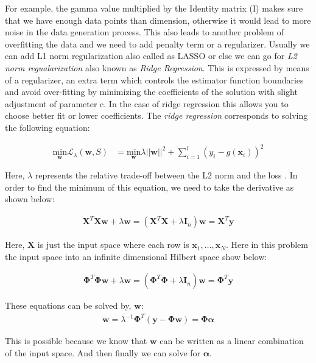 \documentclass[conference]{IEEEtran}
\begin{document}
For example, the gamma value multiplied by the Identity matrix (I) makes sure that we have enough data points than dimension, otherwise it would lead to more noise in the data generation process. This also leads to another problem of overfitting the data and we need to add penalty term or a regularizer. Usually we can add L1 norm regularization also called as LASSO or else we can go for \emph{L2 norm regualarization} also known as \emph{Ridge Regression}. This is expressed by means of a regularizer, an extra term which controls the estimator function boundaries and avoid over-fitting by minimizing the coefficients of the solution with slight adjustment of parameter c. In the case of ridge regression this allows you to choose better fit or lower coefficients.
The \emph{ridge regression} corresponds to solving the following equation: 

\begin{align*}
\underset{\mathbf{w}}{\text{min}} \mathbf{\mathcal{L}}_\lambda (\mathbf{w}, S) &= 
\underset{\mathbf{w}}{\text{min}} \lambda ||\mathbf{w}||^2 + \sum_{i=1}^{l}(y_i - g(\mathbf{x}_i))^2
\end{align*}

Here, $\lambda$ represents the relative trade-off between the L2 norm and the loss \cite{kernelmethods}. In order to find the minimum of this equation, 
we need to take the derivative as shown below: 

\begin{align*}
\mathbf{X}^T\mathbf{X}\mathbf{w} + \lambda\mathbf{w} = (\mathbf{X}^T\mathbf{X} + \lambda \mathbf{I}_n)\mathbf{w} = \mathbf{X}^T\mathbf{y}
\end{align*}

Here, $\mathbf{X}$ is just the input space where each row is $\mathbf{x}_1, \ldots, \mathbf{x}_N$. Here in this problem  the input space into an infinite dimensional Hilbert space show below: 

\begin{align*}
\mathbf{\Phi}^T\mathbf{\Phi}\mathbf{w} + \lambda\mathbf{w} = (\mathbf{\Phi}^T\mathbf{\Phi} + \lambda \mathbf{I}_n)\mathbf{w} = \mathbf{\Phi}^T\mathbf{y}
\end{align*}

These equations can be solved by, $\mathbf{w}$: 
\begin{align*}
\mathbf{w} = \lambda^{-1} \mathbf{\Phi}^T (\mathbf{y} - \mathbf{\Phi} \mathbf{w}) = \mathbf{\Phi}\mathbf{\alpha}
\end{align*}

This is possible because we know that $\mathbf{w}$ can be written as a linear combination of the input space. And then finally we can solve
for $\mathbf{\alpha}$.
\end{document}
